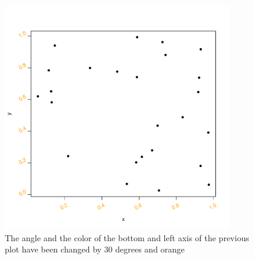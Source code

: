 \documentclass[paper=a4, fontsize=11pt]{report}
\begin{document}
\begin{figure}[h]
	\begin{center}
		\includegraphics[height = 10cm, width = 10cm]{figure/report_basic_demo_4.pdf}
		\caption{The angle and the color of the bottom and left axis of the previous plot have been changed by 30 degrees and orange}
		\label{figure_1.2}
	\end{center}
\end{figure}
\end{document}
